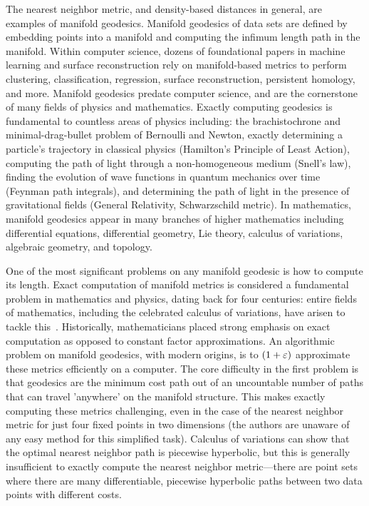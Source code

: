 The nearest neighbor metric, and density-based distances in general, are examples of manifold geodesics.
Manifold geodesics of data sets are defined by embedding points into a manifold and computing the infimum length path in the manifold.
Within computer science, dozens of foundational papers in machine learning and surface reconstruction rely on manifold-based metrics to perform clustering, classification, regression, surface reconstruction, persistent homology, and more.
Manifold geodesics predate computer science, and are the cornerstone of many fields of physics and mathematics.
Exactly computing geodesics is fundamental to countless areas of physics including: the brachistochrone and minimal-drag-bullet problem of Bernoulli and Newton, exactly determining a particle's trajectory in classical physics (Hamilton's Principle of Least Action), computing the path of light through a non-homogeneous medium (Snell's law), finding the evolution of wave functions in quantum mechanics over time (Feynman path integrals), and determining the path of light in the presence of gravitational fields (General Relativity, Schwarzschild metric).
In mathematics, manifold geodesics appear in many branches of higher mathematics including differential equations, differential geometry, Lie theory, calculus of variations, algebraic geometry, and topology.

One of the most significant problems on any manifold geodesic is how to compute its length.
Exact computation of manifold metrics is considered a fundamental problem in mathematics and physics, dating back for four centuries: entire fields of mathematics, including the celebrated calculus of variations, have arisen to tackle this~\cite{Courant53}. Historically, mathematicians placed strong emphasis on exact computation as opposed to constant factor approximations. An algorithmic problem on manifold geodesics, with modern origins, is to $(1+\varepsilon)$ approximate these metrics efficiently on a computer.
The core difficulty in the first problem is that geodesics are the minimum cost path out of an uncountable number of paths that can travel 'anywhere' on the manifold structure.
This makes exactly computing these metrics challenging, even in the case of the nearest neighbor metric for just four fixed points in two dimensions (the authors
are unaware of any easy method for this simplified task).
Calculus of variations can show that the optimal nearest neighbor path is piecewise hyperbolic, but this is generally insufficient to exactly
compute the nearest neighbor metric---there are point sets where there are
many differentiable, piecewise hyperbolic paths between two data points with
different costs.


